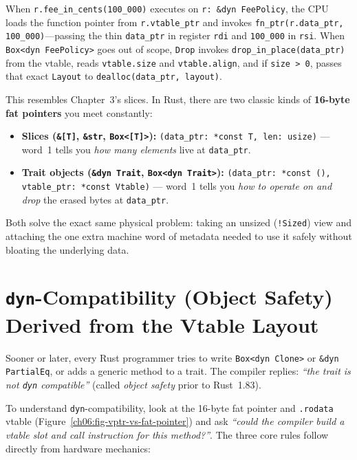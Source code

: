 When \texttt{r.fee\_in\_cents(100\_000)} executes on \texttt{r: \&dyn FeePolicy}, the CPU loads the function pointer from \texttt{r.vtable\_ptr} and invokes \texttt{fn\_ptr(r.data\_ptr, 100\_000)}---passing the thin \texttt{data\_ptr} in register \texttt{rdi} and \texttt{100\_000} in \texttt{rsi}. When \texttt{Box<dyn FeePolicy>} goes out of scope, \texttt{Drop} invokes \texttt{drop\_in\_place(data\_ptr)} from the vtable, reads \texttt{vtable.size} and \texttt{vtable.align}, and if \texttt{size > 0}, passes that exact \texttt{Layout} to \texttt{dealloc(data\_ptr, layout)}.

\begin{intuitionbox}
This resembles Chapter~3's slices. In Rust, there are two classic kinds of \textbf{16-byte fat pointers} you meet constantly:
\begin{itemize}
  \item \textbf{Slices (\texttt{\&[T]}, \texttt{\&str}, \texttt{Box<[T]>}):} \texttt{(data\_ptr: *const T, len: usize)} --- word~1 tells you \emph{how many elements} live at \texttt{data\_ptr}.
  \item \textbf{Trait objects (\texttt{\&dyn Trait}, \texttt{Box<dyn Trait>}):} \texttt{(data\_ptr: *const (), vtable\_ptr: *const Vtable)} --- word~1 tells you \emph{how to operate on and drop} the erased bytes at \texttt{data\_ptr}.
\end{itemize}
Both solve the exact same physical problem: taking an unsized (\texttt{!Sized}) view and attaching the one extra machine word of metadata needed to use it safely without bloating the underlying data.
\end{intuitionbox}

\section{\texttt{dyn}-Compatibility (Object Safety) Derived from the Vtable Layout}
\label{ch06:object-safety}

Sooner or later, every Rust programmer tries to write \texttt{Box<dyn Clone>} or \texttt{\&dyn PartialEq}, or adds a generic method to a trait. The compiler replies: \emph{``the trait is not \texttt{dyn} compatible''} (called \emph{object safety} prior to Rust~1.83).

To understand \texttt{dyn}-compatibility, look at the 16-byte fat pointer and \texttt{.rodata} vtable (Figure~\ref{ch06:fig-vptr-vs-fat-pointer}) and ask \emph{``could the compiler build a vtable slot and call instruction for this method?''}. The three core rules follow directly from hardware mechanics:

